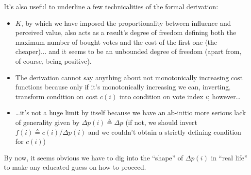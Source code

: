 \documentclass[10pt,a4paper]{article}
\begin{document}
	It’s also useful to underline a few technicalities of the formal derivation:
	\begin{itemize}
		\item $K$, by which we have imposed the proportionality between influence and perceived value, also acts as a result’s degree of freedom defining both the maximum number of bought votes and the cost of the first one (the cheaper)... and it seems to be an unbounded degree of freedom (apart from, of course, being positive).
		\item The derivation cannot say anything about not monotonically increasing cost functions because only if it’s monotonically increasing we can, inverting, transform condition on cost $c(i)$ into condition on vote index $i$; however\dots
		\item \dots it’s not a huge limit by itself because we have an ab-initio more serious lack of generality given by $\Delta p(i) \triangleq \Delta p$ (if not, we should invert ${f(i) \triangleq c(i) / \Delta p(i)}$ and we couldn’t obtain a strictly defining condition for $c(i)$)
	\end{itemize}
	By now, it seems obvious we have to dig into the \enquote{shape} of $\Delta p(i)$ in \enquote{real life} to make any educated guess on how to proceed.
	
\end{document}
